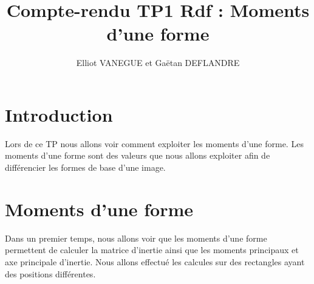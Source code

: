 \documentclass{article}
\title{Compte-rendu TP1 Rdf : Moments d'une forme}
\author{Elliot VANEGUE et Gaëtan DEFLANDRE}
\begin{document}


  \maketitle
  
  \mbox{}
  \newpage
  \clearpage
  
  \section{Introduction}
  Lors de ce TP nous allons voir comment exploiter les moments d'une forme. Les moments
  d'une forme sont des valeurs que nous allons exploiter afin de différencier les formes
  de base d'une image.
  
  \section{Moments d'une forme}
  Dans un premier temps, nous allons voir que les moments d'une forme permettent
  de calculer la matrice d'inertie ainsi que les moments principaux et axe principale
  d'inertie. Nous allons effectué les calcules sur des rectangles ayant des positions différentes.\\
  
\end{document}

